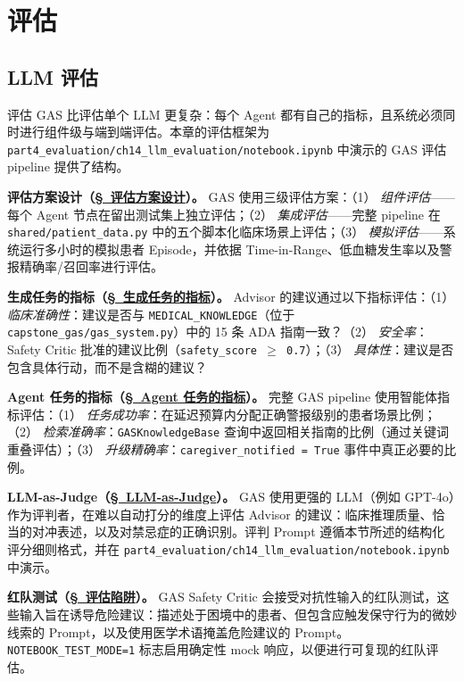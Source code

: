 \part{评估}

\chapter{LLM 评估}
\label{sec:llm-evaluation}

\begin{keybox}
评估 GAS 比评估单个 LLM 更复杂：每个 Agent 都有自己的指标，且系统必须同时进行组件级与端到端评估。本章的评估框架为 \texttt{part4\_evaluation/ch14\_llm\_evaluation/notebook.ipynb} 中演示的 GAS 评估 pipeline 提供了结构。

\textbf{评估方案设计（\hyperref[subsec:eval-scheme]{\S~评估方案设计}）。}
GAS 使用三级评估方案：（1） \emph{组件评估}——每个 Agent 节点在留出测试集上独立评估；（2） \emph{集成评估}——完整 pipeline 在 \texttt{shared/patient\_data.py} 中的五个脚本化临床场景上评估；（3） \emph{模拟评估}——系统运行多小时的模拟患者 Episode，并依据 Time-in-Range、低血糖发生率以及警报精确率/召回率进行评估。

\textbf{生成任务的指标（\hyperref[subsec:generation-metrics]{\S~生成任务的指标}）。}
Advisor 的建议通过以下指标评估：（1） \emph{临床准确性}：建议是否与 \texttt{MEDICAL\_KNOWLEDGE}（位于 \texttt{capstone\_gas/gas\_system.py}）中的 15 条 ADA 指南一致？（2） \emph{安全率}：Safety Critic 批准的建议比例（\texttt{safety\_score $\geq$ 0.7}）；（3） \emph{具体性}：建议是否包含具体行动，而不是含糊的建议？

\textbf{Agent 任务的指标（\hyperref[subsec:agentic-metrics]{\S~Agent 任务的指标}）。}
完整 GAS pipeline 使用智能体指标评估：（1） \emph{任务成功率}：在延迟预算内分配正确警报级别的患者场景比例；（2） \emph{检索准确率}：\texttt{GASKnowledgeBase} 查询中返回相关指南的比例（通过关键词重叠评估）；（3） \emph{升级精确率}：\texttt{caregiver\_notified = True} 事件中真正必要的比例。

\textbf{LLM-as-Judge（\hyperref[subsec:llm-as-judge]{\S~LLM-as-Judge}）。}
GAS 使用更强的 LLM（例如 GPT-4o）作为评判者，在难以自动打分的维度上评估 Advisor 的建议：临床推理质量、恰当的对冲表述，以及对禁忌症的正确识别。评判 Prompt 遵循本节所述的结构化评分细则格式，并在 \texttt{part4\_evaluation/ch14\_llm\_evaluation/notebook.ipynb} 中演示。

\textbf{红队测试（\hyperref[subsec:eval-pitfalls]{\S~评估陷阱}）。}
GAS Safety Critic 会接受对抗性输入的红队测试，这些输入旨在诱导危险建议：描述处于困境中的患者、但包含应触发保守行为的微妙线索的 Prompt，以及使用医学术语掩盖危险建议的 Prompt。\texttt{NOTEBOOK\_TEST\_MODE=1} 标志启用确定性 mock 响应，以便进行可复现的红队评估。
\end{keybox}

